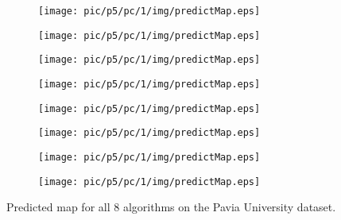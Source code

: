 \documentclass{article}
\begin{document}
	\begin{figure}
		\begin{subfigure}{0.12\textwidth}
			\texttt{[image: pic/p5/pc/1/img/predictMap.eps]}
			\caption{}
		\end{subfigure}
		\begin{subfigure}{0.12\textwidth}
			\texttt{[image: pic/p5/pc/1/img/predictMap.eps]}
			\caption{}
		\end{subfigure}
		\begin{subfigure}{0.12\textwidth}
			\texttt{[image: pic/p5/pc/1/img/predictMap.eps]}
			\caption{}
		\end{subfigure}
		\begin{subfigure}{0.12\textwidth}
			\texttt{[image: pic/p5/pc/1/img/predictMap.eps]}
			\caption{}
		\end{subfigure}
		\begin{subfigure}{0.12\textwidth}
			\texttt{[image: pic/p5/pc/1/img/predictMap.eps]}
			\caption{}
		\end{subfigure}
		\begin{subfigure}{0.12\textwidth}
			\texttt{[image: pic/p5/pc/1/img/predictMap.eps]}
			\caption{}
		\end{subfigure}
		\begin{subfigure}{0.12\textwidth}
			\texttt{[image: pic/p5/pc/1/img/predictMap.eps]}
			\caption{}
		\end{subfigure}
		\begin{subfigure}{0.12\textwidth}
			\texttt{[image: pic/p5/pc/1/img/predictMap.eps]}
			\caption{}
		\end{subfigure}
		\caption{Predicted map for all 8 algorithms on the Pavia University dataset.}
		\label{pupm}
	\end{figure}
\end{document}
